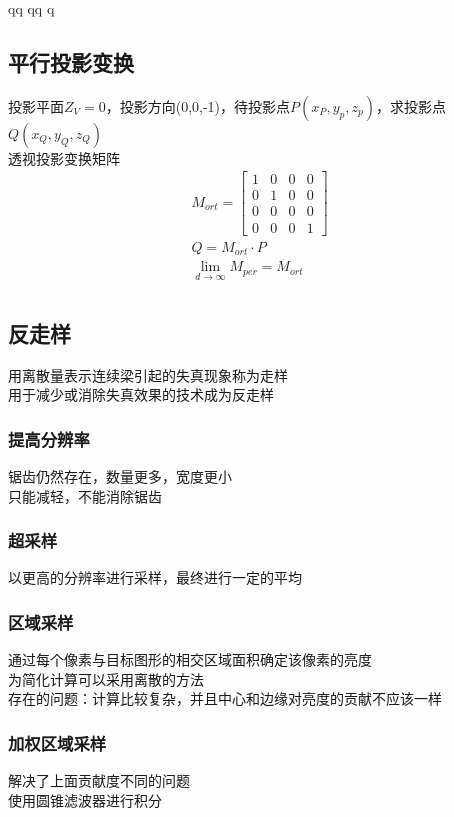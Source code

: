qq	qq	q                                                                                                                                                                                                                                                                                      \documentclass{article}
\begin{document}
\begin{CJK}{UTF8}{gbsn}
	\subsection{平行投影变换}
	投影平面$Z_V=0$，投影方向(0,0,-1)，待投影点$P(x_P,y_p,z_p)$，求投影点$Q(x_Q,y_Q,z_Q)$\\
	透视投影变换矩阵\\
	\begin{equation*}
	\begin{split}	
	M_{ort}=\begin{bmatrix}
	1&0&0&0\\
	0&1&0&0\\
	0&0&0&0\\
	0&0&0&1
	\end{bmatrix}\\
	Q=M_{ort}\cdot P\\
	\lim\limits_{d\rightarrow \infty}M_{per}=M_{ort}\\
	\end{split}
	\end{equation*}
	\subsection{反走样}
	用离散量表示连续梁引起的失真现象称为走样\\
	用于减少或消除失真效果的技术成为反走样\\
	\subsubsection{提高分辨率}
	锯齿仍然存在，数量更多，宽度更小\\
	只能减轻，不能消除锯齿\\
	\subsubsection{超采样}
	以更高的分辨率进行采样，最终进行一定的平均\\
	\subsubsection{区域采样}
	通过每个像素与目标图形的相交区域面积确定该像素的亮度\\
	为简化计算可以采用离散的方法\\
	存在的问题：计算比较复杂，并且中心和边缘对亮度的贡献不应该一样\\
	\subsubsection{加权区域采样}
	解决了上面贡献度不同的问题\\
	使用圆锥滤波器进行积分\\

\end{CJK}
\end{document}

